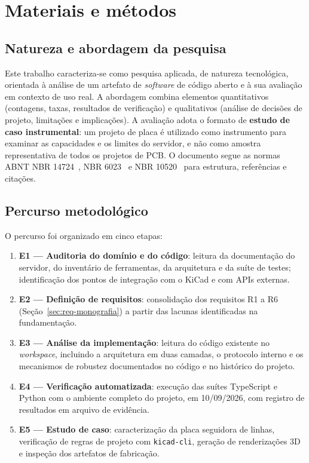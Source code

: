 \chapter{Materiais e métodos}\label{cap:metodologia}

\section{Natureza e abordagem da pesquisa}

Este trabalho caracteriza-se como pesquisa aplicada, de natureza tecnológica,
orientada à análise de um artefato de \emph{software} de código aberto e à sua
avaliação em contexto de uso real. A abordagem combina elementos
quantitativos (contagens, taxas, resultados de verificação) e qualitativos
(análise de decisões de projeto, limitações e implicações). A avaliação adota
o formato de \textbf{estudo de caso instrumental}: um projeto de placa é
utilizado como instrumento para examinar as capacidades e os limites do
servidor, e não como amostra representativa de todos os projetos de PCB. O
documento segue as normas ABNT NBR 14724~\cite{abnt14724},
NBR 6023~\cite{abnt6023} e NBR 10520~\cite{abnt10520} para estrutura,
referências e citações.

\section{Percurso metodológico}

O percurso foi organizado em cinco etapas:

\begin{enumerate}[leftmargin=1.4em,itemsep=0.25em]
  \item \textbf{E1 --- Auditoria do domínio e do código}: leitura da
        documentação do servidor, do inventário de ferramentas, da arquitetura
        e da suíte de testes; identificação dos pontos de integração com o
        KiCad e com APIs externas.
  \item \textbf{E2 --- Definição de requisitos}: consolidação dos requisitos
        R1 a R6 (Seção~\ref{sec:req-monografia}) a partir das lacunas
        identificadas na fundamentação.
  \item \textbf{E3 --- Análise da implementação}: leitura do código existente
        no \emph{workspace}, incluindo a arquitetura em duas camadas, o
        protocolo interno e os mecanismos de robustez documentados no código
        e no histórico do projeto.
  \item \textbf{E4 --- Verificação automatizada}: execução das suítes
        TypeScript e Python com o ambiente completo do projeto, em
        10/09/2026, com registro de resultados em arquivo de evidência.
  \item \textbf{E5 --- Estudo de caso}: caracterização da placa seguidora de
        linhas, verificação de regras de projeto com \texttt{kicad-cli},
        geração de renderizações 3D e inspeção dos artefatos de fabricação.
\end{enumerate}


